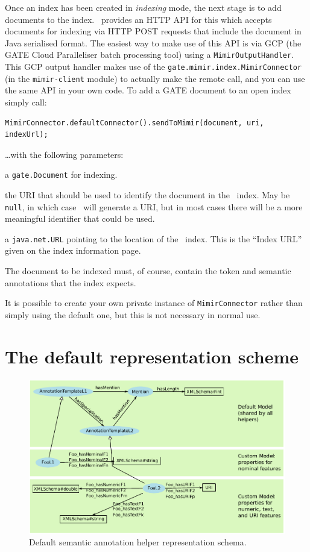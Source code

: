 Once an index has been created in {\em indexing} mode, the next stage is to add
documents to the index.  \Mimir\ provides an HTTP API for this which accepts
documents for indexing via HTTP POST requests that include the document in Java
serialised format.  The easiest way to make use of this API is via GCP (the
GATE Cloud Paralleliser batch processing tool) using a
\lstinline!MimirOutputHandler!.  This GCP output handler makes use of the
\lstinline!gate.mimir.index.MimirConnector! (in the {\tt mimir-client} module)
to actually make the remote call, and you can use the same API in your own
code.  To add a GATE document to an open index simply call:
\begin{lstlisting}[breaklines]
MimirConnector.defaultConnector().sendToMimir(document, uri, indexUrl);
\end{lstlisting}
%
\ldots{}with the following parameters:
\bde
\item[document] a \lstinline!gate.Document! for indexing.
\item[uri] the URI that should be used to identify the document in the \Mimir\
  index.  May be \lstinline!null!, in which case \Mimir\ will generate a URI,
  but in most cases there will be a more meaningful identifier that could be
  used.
\item[indexUrl] a \lstinline!java.net.URL! pointing to the location of the
  \Mimir\ index.  This is the ``Index URL'' given on the index information page.
\ede

The document to be indexed must, of course, contain the token and semantic
annotations that the index expects.

It is possible to create your own private instance of
\lstinline!MimirConnector! rather than simply using the default one, but this
is not necessary in normal use.

\section{The default representation scheme}\label{sec:indexing:dsah-detail}

\begin{figure}[htb]
\begin{center}
\includegraphics[scale=0.66]{img/dsah-model}
\caption{Default semantic annotation helper representation schema.}
\label{fig:dsah-model}
\end{center}
\end{figure}

